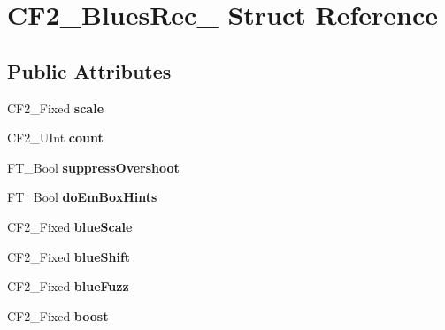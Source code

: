 \hypertarget{struct_c_f2___blues_rec__}{}\section{C\+F2\+\_\+\+Blues\+Rec\+\_\+ Struct Reference}
\label{struct_c_f2___blues_rec__}
\subsection*{Public Attributes}
\begin{DoxyCompactItemize}
\item 
\mbox{\label{struct_c_f2___blues_rec___aeea3ec6599962b87c909375f6f8e6ebd}} 
C\+F2\+\_\+\+Fixed {\bfseries scale}
\item 
\mbox{\label{struct_c_f2___blues_rec___aa26bfc6018fc22ff99c52cff654760da}} 
C\+F2\+\_\+\+U\+Int {\bfseries count}
\item 
\mbox{\label{struct_c_f2___blues_rec___a1ad38f3c703062e465051206937cb135}} 
F\+T\+\_\+\+Bool {\bfseries suppress\+Overshoot}
\item 
\mbox{\label{struct_c_f2___blues_rec___aa3d6184700d932ef2c77fe746491d09d}} 
F\+T\+\_\+\+Bool {\bfseries do\+Em\+Box\+Hints}
\item 
\mbox{\label{struct_c_f2___blues_rec___a7abf1d72e954c0d73977f279a5bacc8a}} 
C\+F2\+\_\+\+Fixed {\bfseries blue\+Scale}
\item 
\mbox{\label{struct_c_f2___blues_rec___a1abc851e3269c00c08facf4f1efd0c29}} 
C\+F2\+\_\+\+Fixed {\bfseries blue\+Shift}
\item 
\mbox{\label{struct_c_f2___blues_rec___a030e0fc620579216f6cc184e2874c230}} 
C\+F2\+\_\+\+Fixed {\bfseries blue\+Fuzz}
\item 
\mbox{\label{struct_c_f2___blues_rec___a9f2132c2ecc4ee31c571f0f6daf96a2e}} 
C\+F2\+\_\+\+Fixed {\bfseries boost}
\item 
\mbox{\label{struct_c_f2___blues_rec___ab9916b4121e19269a4a0a47f3b188c0c}} 

\end{DoxyCompactItemize}

